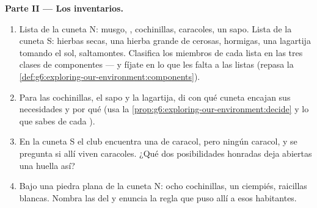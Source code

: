 \begin{problem}
\medskip\noindent\textbf{Parte II --- Los inventarios.}
\begin{enumerate}[resume]
  \item Lista de la cuneta N: musgo, , cochinillas, caracoles,
        un sapo. Lista de la cuneta S: hierbas secas, una hierba grande
        de  cerosas, hormigas, una lagartija tomando el sol,
        saltamontes. Clasifica los miembros de cada lista en las tres
        clases de componentes --- y fíjate en lo que les falta a las
        listas (repasa la
        \cref{def:g6:exploring-our-environment:components}).
  \item Para las cochinillas, el sapo y la lagartija, di con qué
        cuneta encajan sus necesidades y por qué (usa la
        \cref{prop:g6:exploring-our-environment:decide} y lo que sabes
        de cada ).
  \item En la cuneta S el club encuentra una  de caracol, pero
        ningún caracol, y se pregunta si allí viven caracoles. ¿Qué
        dos posibilidades honradas deja abiertas una huella así?
  \item Bajo una piedra plana de la cuneta N: ocho cochinillas, un
        ciempiés, raicillas blancas. Nombra las  del
         y enuncia la regla que puso allí a esos habitantes.
\end{enumerate}


\end{problem}
